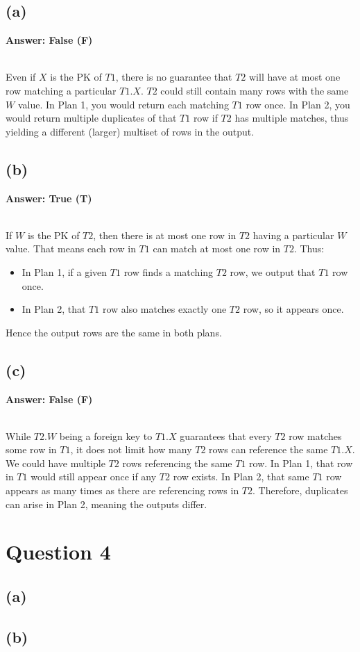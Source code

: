 \documentclass{article}
\begin{document}
\subsection*{(a)}
\textbf{Answer: False (F)}

\leavevmode\\
Even if $X$ is the PK of $T1$, there is no guarantee that $T2$ will have at most one row matching a particular $T1.X$. $T2$ could still contain many rows with the same $W$ value. In Plan 1, you would return each matching $T1$ row once. In Plan 2, you would return multiple duplicates of that $T1$ row if $T2$ has multiple matches, thus yielding a different (larger) multiset of rows in the output.

\newpage
\subsection*{(b)}
\textbf{Answer: True (T)}

\leavevmode\\
If $W$ is the PK of $T2$, then there is at most one row in $T2$ having a particular $W$ value. That means each row in $T1$ can match  at most one  row in $T2$. Thus:

\begin{itemize}
  \item In Plan 1, if a given $T1$ row finds a matching $T2$ row, we output that $T1$ row once.
  \item In Plan 2, that $T1$ row also matches exactly one $T2$ row, so it appears once.
\end{itemize}

Hence the output rows are the same in both plans.

\subsection*{(c)}
\textbf{Answer: False (F)}

\leavevmode\\
While $T2.W$ being a foreign key to $T1.X$ guarantees that every $T2$ row matches  some  row in $T1$, it  does not  limit how many $T2$ rows can reference the  same  $T1.X$. We could have multiple $T2$ rows referencing the same $T1$ row. In Plan 1, that row in $T1$ would still appear  once  if any $T2$ row exists. In Plan 2, that same $T1$ row appears  as many times  as there are referencing rows in $T2$. Therefore, duplicates can arise in Plan 2, meaning the outputs differ.

\newpage
\section*{Question 4}
\subsection*{(a)}


\newpage
\subsection*{(b)}
\end{document}
